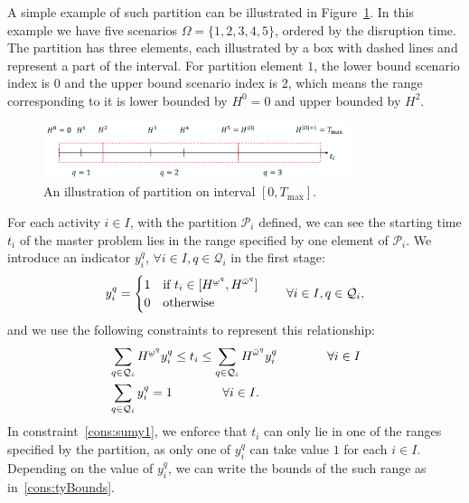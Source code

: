 \documentclass[11pt]{article}
\newcommand{\noi}{\noindent}
\renewcommand{\underbar}{\underaccent{\bar}}
\begin{document}
	\noi A simple example of such partition can be illustrated in Figure~\ref{fig:simplePart}. In this example we have five scenarios \(\Omega = \{1,2,3,4,5\}\), ordered by the disruption time. The partition has three elements, each illustrated by a box with dashed lines and represent a part of the interval. For partition element \(1\), the lower bound scenario index is \(0\) and the upper bound scenario index is \(2\), which means the range corresponding to it is lower bounded by \(H^0 = 0\) and upper bounded by \(H^2\).
	\begin{figure}[H]
		\centering
		\includegraphics[width=0.8\textwidth]{simplePart}
		\caption{An illustration of partition on interval \([0,T_{\max}]\).}
		\label{fig:simplePart}
	\end{figure}
	\noi For each activity \(i \in I\), with the partition \(\mathcal{P}_i\) defined, we can see the starting time \(t_i\) of the master problem lies in the range specified by one element of \(\mathcal{P}_i\). We introduce an indicator \(y_i^q\), \(\forall i \in I, q \in \mathcal{Q}_i\) in the first stage:
	\begin{equation}
		y_i^q = \begin{cases}
			1 & \text{if \(t_i \in [H^{\underbar{\omega}^q},H^{\bar{\omega}^q}]\)}\\
			0 & \text{otherwise}
		\end{cases}
		\qquad \forall i \in I, q \in \mathcal{Q}_i,
	\end{equation}
	and we use the following constraints to represent this relationship:
	\begin{subequations} \label{cons:yCons}
		\begin{align}
			& \sum_{q \in \mathcal{Q}_i} H^{\underbar{\omega}^q} y_i^{q} \leq t_i \leq \sum_{q \in \mathcal{Q}_i} H^{\bar{\omega}^q} y_i^{q} \qquad \qquad \forall i \in I \label{cons:tyBounds}\\
			& \sum_{q \in \mathcal{Q}_i} y_i^q = 1 \qquad \qquad \forall i \in I. \label{cons:sumy1}
		\end{align}
	\end{subequations}
	In constraint~\eqref{cons:sumy1}, we enforce that \(t_i\) can only lie in one of the ranges specified by the partition, as only one of \(y_i^q\) can take value \(1\) for each \(i \in I\). Depending on the value of \(y_i^q\), we can write the bounds of the such range as in~\eqref{cons:tyBounds}. \\
\end{document}
